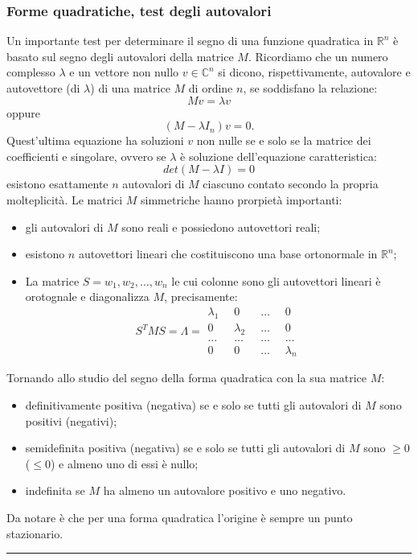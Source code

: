 \subsubsection*{Forme quadratiche, test degli autovalori}
Un importante test per determinare il segno di una funzione quadratica in $\mathbb{R}^n$ è basato sul segno degli autovalori della matrice $M$.\newline
Ricordiamo che un numero complesso $\lambda$ e un vettore non nullo $v \in \mathbb{C}^n$ si dicono, rispettivamente, autovalore e autovettore (di $\lambda$) di una matrice $M$ di ordine $n$, se soddisfano la relazione:
\[
    Mv = \lambda v
\]
oppure
\[
    (M-\lambda I_n)v = 0.
\]
Quest'ultima equazione ha soluzioni $v$ non nulle se e solo se la matrice dei coefficienti e singolare, ovvero se $\lambda$ è soluzione dell'equazione caratteristica:
\[
    det(M-\lambda I) = 0
\]
esistono esattamente $n$ autovalori di $M$ ciascuno contato secondo la propria molteplicità.\newline
Le matrici $M$ simmetriche hanno prorpietà importanti:
\begin{itemize}
    \item gli autovalori di $M$ sono reali e possiedono autovettori reali;
    \item esistono $n$ autovettori lineari che costituiscono una base ortonormale in $\mathbb{R}^n$;
    \item La matrice $S = {w_1, w_2, \dots, w_n}$ le cui colonne sono gli autovettori lineari è orotognale e diagonalizza $M$, precisamente:
    \[
        S^TMS = \Lambda = \begin{matrix}
            \lambda_1 \;\; &0 \;\; &\dots \;\; &0\\
            0 \;\; &\lambda_2 \;\; &\dots \;\; &0\\
            \dots \;\; &\dots \;\; &\dots \;\; &\dots\\
            0 \;\; &0 \;\; &\dots \;\; &\lambda_n
        \end{matrix}
    \]
\end{itemize}
Tornando allo studio del segno della forma quadratica con la sua matrice $M$:
\begin{itemize}
    \item definitivamente positiva (negativa) se e solo se tutti gli autovalori di $M$ sono positivi (negativi);
    \item semidefinita positiva (negativa) se e solo se tutti gli autovalori di $M$ sono $\geq 0$ ($\leq 0$) e almeno uno di essi è nullo;
    \item indefinita se $M$ ha almeno un autovalore positivo e uno negativo.
\end{itemize}
Da notare è che per una forma quadratica l'origine è sempre un punto stazionario. \newline
\rule{\textwidth}{0.4pt}
